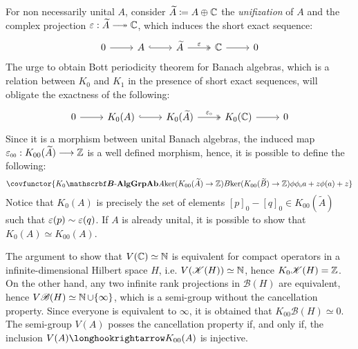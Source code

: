\begin{definicao}
\begin{itroman}
For non necessarily unital $A$, consider $\widetilde{A} \coloneqq A \oplus \operatorname{\mathbb{C}}$ the \textit{unifization} of $A$ and the complex projection $\varepsilon: \widetilde{A} \longtwoheadrightarrow \C$, which induces the short exact sequence:
\begin{equation*}
    \label{eq:short exact sequence unital}
\begin{tikzcd}
    0 \arrow[r] & A \arrow[r, hook] & \widetilde A \arrow[r, "\varepsilon", two heads] & \mathbb C \arrow[r] & 0
    \end{tikzcd}
\end{equation*}
The urge to obtain Bott periodicity theorem for Banach algebras, which is a relation between $K_0$ and $K_1$ in the presence of short exact sequences, will obligate the exactness of the following:
\begin{equation*}
    \label{eq:K0(short exact sequence unital)}
\begin{tikzcd}
    0 \arrow[r] & K_0(A) \arrow[r, hook] & K_0(\widetilde A) \arrow[r, "\sub\varepsilon0", two heads] & K_0(\mathbb C) \arrow[r] & 0
    \end{tikzcd}
\end{equation*}
Since it is a morphism between unital Banach algebras, the induced map $\sub{\ep}{00} : K_{00}(\widetilde{A}) \longto \Z$ is a well defined morphism, hence, it is possible to define the following:
\begin{equation*}
    \covfunctor{{K_0}{\BAlg}{\Ab{\Grp}}{A}{\ker(K_{00}(\widetilde{A}) \to \Z)}{B}{\ker(K_{00}(\widetilde{B}) \to \Z)}{\phi}{\sub\phi0}{a+ z}{\phi(a)+z}}
\end{equation*}
Notice that $K_0(A)$ is precisely the set of elements $[p]_0-[q]_0 \in K_{00}(\widetilde{A})$ such that $\operatorname{{\varepsilon}}(p) \sim \operatorname{{\varepsilon}}(q)$. If $A$ is already unital, it is possible to show that $K_0(A) \simeq K_{00}(A)$. 
\end{itroman}
\end{definicao}

\begin{observacao}
    The argument to show that $V(\operatorname{\mathbb{C}}) \simeq \operatorname{\mathbb{N}}$  is equivalent for compact operators in a infinite-dimensional Hilbert space $H$, i.e. $V(\mathscr K(H)) \simeq \operatorname{\mathbb{N}}$, hence $K_0\mathscr K(H) = \operatorname{\mathbb{Z}}$. On the other hand, any two infinite rank projections in $\mathscr B(H)$ are equivalent, hence $V\mathscr B(H) \simeq \operatorname{\mathbb{N}} \cup \{\infty\}$, which is a semi-group without the cancellation property. Since everyone is equivalent to $\infty$, it is obtained that $K_{00}\mathscr B(H) \simeq 0$. The semi-group $V(A)$ posses the cancellation property if, and only if, the inclusion $V(A)\longhookrightarrow K_{00}(A)$ is injective. 
\end{observacao}

